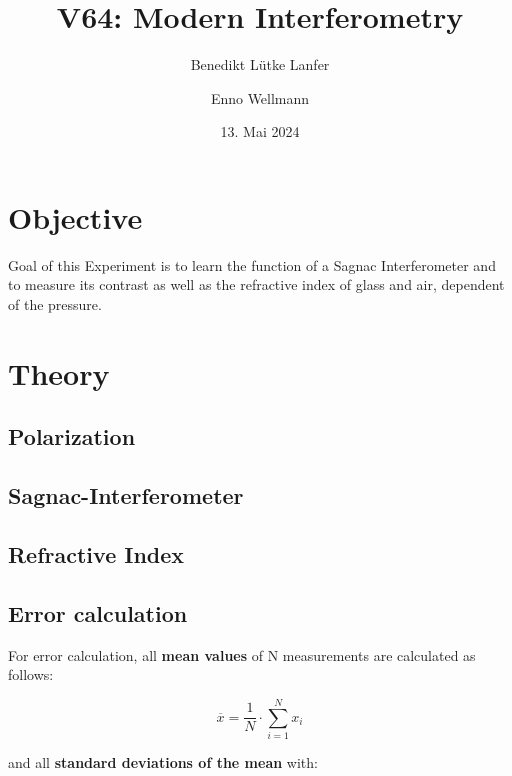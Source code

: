 

\title{V64: Modern Interferometry}
\author{Benedikt Lütke Lanfer \and Enno Wellmann}
\date{13. Mai 2024}
\publishers{TU Dortmund – Fakultät Physik}


% 
\maketitle
\tableofcontents
\newpage


% 
\section{Objective}
Goal of this Experiment is to learn the function of a Sagnac Interferometer and to measure its contrast as well as the 
refractive index of glass and air, dependent of the pressure. 


\section{Theory}
\subsection{Polarization}

\subsection{Sagnac-Interferometer}

\subsection{Refractive Index}

\subsection{Error calculation}
For error calculation, all \textbf{mean values} of N measurements are calculated as follows:

\begin{equation}
    \overline{x} = \frac{1}{N} \cdot \sum_{i=1}^N x_i
    \label{eqn:Mittelwert}
\end{equation}

and all \textbf{standard deviations of the mean} with:

